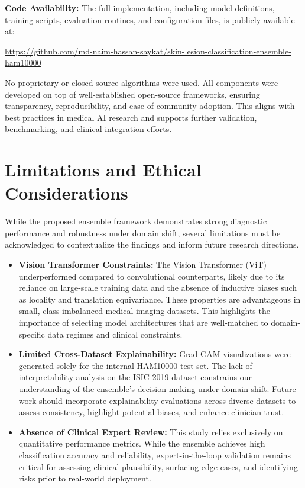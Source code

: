 \documentclass[pdflatex,sn-mathphys-num]{sn-jnl}%
\theoremstyle{thmstyleone}%
\theoremstyle{thmstyletwo}%
\theoremstyle{thmstylethree}%
\begin{document}
\medskip
\noindent
\textbf{Code Availability:} The full implementation, including model definitions, training scripts, evaluation routines, and configuration files, is publicly available at:

\noindent
\url{https://github.com/md-naim-hassan-saykat/skin-lesion-classification-ensemble-ham10000}

\medskip
\noindent
No proprietary or closed-source algorithms were used. All components were developed on top of well-established open-source frameworks, ensuring transparency, reproducibility, and ease of community adoption. This aligns with best practices in medical AI research and supports further validation, benchmarking, and clinical integration efforts.


\section{Limitations and Ethical Considerations}\label{sec9}

While the proposed ensemble framework demonstrates strong diagnostic performance and robustness under domain shift, several limitations must be acknowledged to contextualize the findings and inform future research directions.

\begin{itemize}
    \item \textbf{Vision Transformer Constraints:} The Vision Transformer (ViT) underperformed compared to convolutional counterparts, likely due to its reliance on large-scale training data and the absence of inductive biases such as locality and translation equivariance. These properties are advantageous in small, class-imbalanced medical imaging datasets. This highlights the importance of selecting model architectures that are well-matched to domain-specific data regimes and clinical constraints.

    \item \textbf{Limited Cross-Dataset Explainability:} Grad-CAM visualizations were generated solely for the internal HAM10000 test set. The lack of interpretability analysis on the ISIC 2019 dataset constrains our understanding of the ensemble's decision-making under domain shift. Future work should incorporate explainability evaluations across diverse datasets to assess consistency, highlight potential biases, and enhance clinician trust.

    \item \textbf{Absence of Clinical Expert Review:} This study relies exclusively on quantitative performance metrics. While the ensemble achieves high classification accuracy and reliability, expert-in-the-loop validation remains critical for assessing clinical plausibility, surfacing edge cases, and identifying risks prior to real-world deployment.
\end{itemize}
\end{document}
